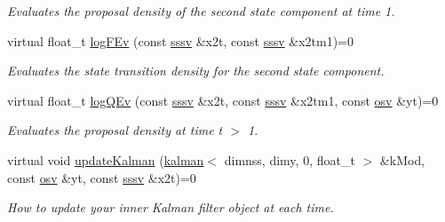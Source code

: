 \begin{DoxyCompactItemize}
\begin{DoxyCompactList}\small\item\em Evaluates the proposal density of the second state component at time 1. \end{DoxyCompactList}\item 
virtual float\+\_\+t \hyperlink{classrbpf__kalman_ab14d5ef38a664067a2eaec1b3ada1abc}{log\+F\+Ev} (const \hyperlink{classrbpf__kalman_a616e56c08c1a6b476e065b2200433915}{sssv} \&x2t, const \hyperlink{classrbpf__kalman_a616e56c08c1a6b476e065b2200433915}{sssv} \&x2tm1)=0
\begin{DoxyCompactList}\small\item\em Evaluates the state transition density for the second state component. \end{DoxyCompactList}\item 
virtual float\+\_\+t \hyperlink{classrbpf__kalman_a532c85ee43223a4c727de2d636ee8e45}{log\+Q\+Ev} (const \hyperlink{classrbpf__kalman_a616e56c08c1a6b476e065b2200433915}{sssv} \&x2t, const \hyperlink{classrbpf__kalman_a616e56c08c1a6b476e065b2200433915}{sssv} \&x2tm1, const \hyperlink{classrbpf__kalman_ae6e59c034c1b0abc7871887ae088055e}{osv} \&yt)=0
\begin{DoxyCompactList}\small\item\em Evaluates the proposal density at time t $>$ 1. \end{DoxyCompactList}\item 
virtual void \hyperlink{classrbpf__kalman_a1d4dac41b89e8bfd6f54d10c737d4e42}{update\+Kalman} (\hyperlink{classkalman}{kalman}$<$ dimnss, dimy, 0, float\+\_\+t $>$ \&k\+Mod, const \hyperlink{classrbpf__kalman_ae6e59c034c1b0abc7871887ae088055e}{osv} \&yt, const \hyperlink{classrbpf__kalman_a616e56c08c1a6b476e065b2200433915}{sssv} \&x2t)=0
\begin{DoxyCompactList}\small\item\em How to update your inner Kalman filter object at each time. \end{DoxyCompactList}\end{DoxyCompactItemize}

